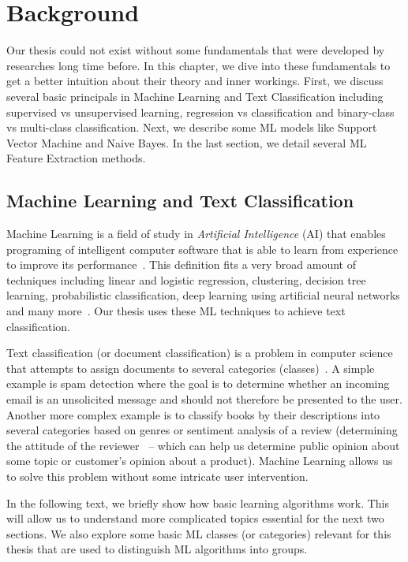 \chapter{Background}
\label{chapter:background}

Our thesis could not exist without some fundamentals that were developed by researches long time before. In this chapter, we dive into these fundamentals to get a better intuition about their theory and inner workings. First, we discuss several basic principals in Machine Learning and Text Classification including supervised vs unsupervised learning, regression vs classification and binary-class vs multi-class classification. Next, we describe some ML models like Support Vector Machine and Naive Bayes. In the last section, we detail several ML Feature Extraction methods.

\section{Machine Learning and Text Classification}

Machine Learning is a field of study in \textit{Artificial Intelligence} (AI) that enables programing of intelligent computer software that is able to learn from experience to improve its performance~\cite{Samuel1959}. This definition fits a very broad amount of techniques including linear and logistic regression, clustering, decision tree learning, probabilistic classification, deep learning using artificial neural networks and many more~\cite{bishop2006pattern}. Our thesis uses these ML techniques to achieve text classification.

Text classification (or document classification) is a problem in computer science that attempts to assign documents to several categories (classes)~\cite{Anvik2006}. A simple example is spam detection where the goal is to determine whether an incoming email is an unsolicited message and should not therefore be presented to the user. Another more complex example is to classify books by their descriptions into several categories based on genres or sentiment analysis of a review (determining the attitude of the reviewer~\cite{pang2008sentiment} -- which can help us determine public opinion about some topic or customer's opinion about a product). Machine Learning allows us to solve this problem without some intricate user intervention.

In the following text, we briefly show how basic learning algorithms work. This will allow us to understand more complicated topics essential for the next two sections. We also explore some basic ML classes (or categories) relevant for this thesis that are used to distinguish ML algorithms into groups.

